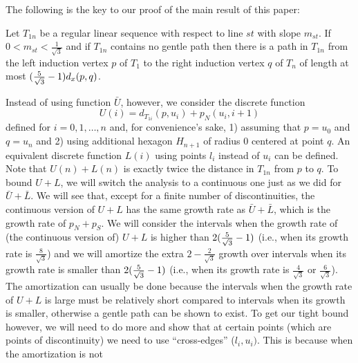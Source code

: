 The following is the key to our proof of the main result of this paper:
\begin{lemma}
\label{le:mainlemmaB}
Let $T_{1n}$ be a regular linear sequence with respect to line $st$ with slope
$m_{st}$. If $0 < m_{st} < \frac{1}{\sqrt{3}}$ and if $T_{1n}$ contains no
gentle path then there is a path in $T_{1n}$ from 
the left induction vertex $p$ of $T_1$ to the right induction vertex $q$ of
$T_n$ of length at most  $(\frac{5}{\sqrt{3}}-1) d_x(p,q)$.
\end{lemma}
\iftoggle{abstract}{We will discuss the proof of the Amortization Lemma in 
Section~\ref{sec:proofB}; the proof builds 
on the analysis done in Section~\ref{sec:proofA} to prove (Technical) 
Lemma~\ref{le:mainlemmaA}.}{We will prove the Amortization Lemma in Section~\ref{sec:proofB} by building 
on the analysis done in Section~\ref{sec:proofA} to prove (Technical) 
Lemma~\ref{le:mainlemmaA}.} 
Instead of using function $\bar{U}$, however, we consider the discrete 
function
\begin{equation*}
U(i) = d_{T_{1i}}(p,u_i) + p_N(u_{i},i+1)
\end{equation*}
defined for $i=0,1,\dots,n$ and, for convenience's sake, 1) assuming that 
$p=u_0$ and $q=u_n$ and 2) using additional hexagon $H_{n+1}$ of radius $0$
centered at point $q$. An equivalent discrete function $L(i)$ using points 
$l_i$ instead of $u_i$ can be defined. Note that $U(n) + L(n)$ is exactly twice
the distance in
$T_{1n}$ from $p$ to $q$. To bound $U + L$, we will switch the analysis to
a continuous one just as we did for ${\bar U} + {\bar L}$. We will see that,
except for a finite number of discontinuities, the continuous version of $U+L$
has the same growth rate as ${\bar U} + {\bar L}$, which is the growth
rate of $p_N+p_S$. 
We will consider the intervals when the growth rate of (the continuous version of)
$U+L$ is higher than $2(\frac{5}{\sqrt{3}}-1)$ (i.e., when its growth rate is $\frac{8}{\sqrt{3}}$) 
and we will amortize the extra $2 - \frac{2}{\sqrt{3}}$ growth over 
intervals when its growth rate is smaller than $2(\frac{5}{\sqrt{3}}-1)$ (i.e., when its
growth rate is $\frac{4}{\sqrt{3}}$ or $\frac{6}{\sqrt{3}}$).
The amortization can usually be done because the intervals when the growth rate
of $U+L$ is large must be relatively short compared to intervals when
its growth is smaller, otherwise a gentle path can be shown to exist. To get our
tight bound however, we will need to do more and show that at certain points
(which are points of discontinuity)  we need to use ``cross-edges'' ($l_i,u_i)$.
This is because when the amortization is not
